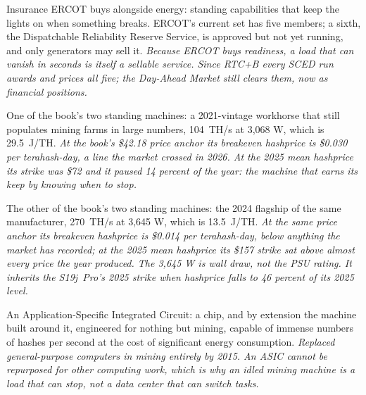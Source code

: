 \begin{description}[leftmargin=0pt,style=unboxed,itemsep=0.35em,parsep=0.15em]
\item[ancillary service (AS)] \hypertarget{glossary:ancillary-service}{}Insurance ERCOT buys alongside energy: standing capabilities that keep the lights on when something breaks. ERCOT's current set has five members; a sixth, the Dispatchable Reliability Reserve Service, is approved but not yet running, and only generators may sell it. \emph{Because ERCOT buys readiness, a load that can vanish in seconds is itself a sellable service. Since RTC+B every SCED run awards and prices all five; the Day-Ahead Market still clears them, now as financial positions.}
\item[Antminer S19j Pro (S19j Pro)] \hypertarget{glossary:antminer-s19j-pro}{}One of the book's two standing machines: a 2021-vintage workhorse that still populates mining farms in large numbers, 104~TH/s at 3,068 W, which is 29.5~J/TH. \emph{At the book's \$42.18 price anchor its breakeven hashprice is \$0.030 per terahash-day, a line the market crossed in 2026. At the 2025 mean hashprice its strike was \$72 and it paused 14 percent of the year: the machine that earns its keep by knowing when to stop.}
\item[Antminer S21 XP (S21 XP)] \hypertarget{glossary:antminer-s21-xp}{}The other of the book's two standing machines: the 2024 flagship of the same manufacturer, 270~TH/s at 3,645 W, which is 13.5~J/TH. \emph{At the same price anchor its breakeven hashprice is \$0.014 per terahash-day, below anything the market has recorded; at the 2025 mean hashprice its \$157 strike sat above almost every price the year produced. The 3,645 W is wall draw, not the PSU rating. It inherits the S19j~Pro's 2025 strike when hashprice falls to 46 percent of its 2025 level.}
\item[ASIC] \hypertarget{glossary:asic}{}An Application-Specific Integrated Circuit: a chip, and by extension the machine built around it, engineered for nothing but mining, capable of immense numbers of hashes per second at the cost of significant energy consumption. \emph{Replaced general-purpose computers in mining entirely by 2015. An ASIC cannot be repurposed for other computing work, which is why an idled mining machine is a load that can stop, not a data center that can switch tasks.}

\end{description}
